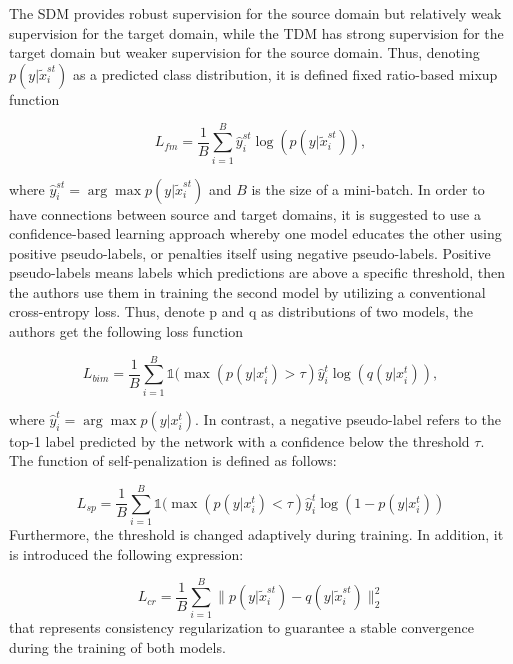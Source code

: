 The SDM provides robust supervision for the source domain but relatively weak supervision for the target domain, while the TDM has strong supervision for the target domain but weaker supervision for the source domain. Thus, denoting $p(y| \tilde{x}^{st}_i)$ as a predicted class distribution, it is defined fixed ratio-based mixup function 

\begin{equation}
\label{eq:fixbi1}
L_{fm} = \dfrac{1}{B} \sum_{i = 1}^B \hat{y}^{st}_i \log (p(y|\tilde{x}^{st}_i)),
\end{equation}

where $\hat{y}^{st}_i = \arg \max p(y|\tilde{x}^{st}_i)$ and $B$ is the size of a mini-batch. In order to have connections between source and target domains, it is suggested to use a confidence-based learning approach whereby one model educates the other using positive pseudo-labels, or penalties itself using negative pseudo-labels. Positive pseudo-labels means labels which predictions are above a specific threshold, then the authors use them in training the second model by utilizing a conventional cross-entropy loss. Thus, denote p and q as distributions of two models, the authors get the following loss function

\begin{equation}
L_{bim} = \dfrac{1}{B}\sum_{i=1}^B \mathds{1}(\max (p(y|x_i^t) > \tau)\hat{y}_i^t \log (q(y|x_i^t)),
\end{equation}

where $\hat{y}_i^t = \arg \max p(y|x_i^t)$. In contrast, a negative pseudo-label refers to the top-1 label predicted by the network with a confidence below the threshold $\tau$. The function of self-penalization is defined as follows:

\begin{equation}
L_{sp} = \dfrac{1}{B}\sum_{i=1}^B \mathds{1}(\max (p(y|x_i^t) < \tau)\hat{y}_i^t \log (1 - p(y|x_i^t))
\end{equation}
Furthermore, the threshold is changed adaptively during training. In addition, it is introduced the following expression: 

\begin{equation}
\label{eq:fixbi4}
L_{cr} = \dfrac{1}{B} \sum_{i=1}^B \| p(y|\tilde{x}^{st}_i) - q(y|\tilde{x}^{st}_i)\|^2_2
\end{equation}
that represents consistency regularization to guarantee a stable convergence during the training of both models.